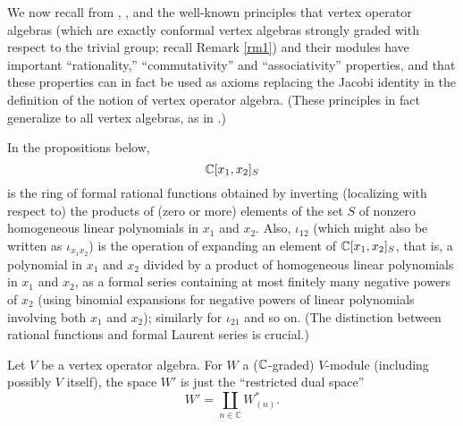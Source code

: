 \documentclass[12pt]{article}
\begin{document}
We now recall {}from \cite{FLM2}, \cite{FHL}, \cite{DL} and \cite{LL}
the well-known principles that vertex operator algebras (which are
exactly conformal vertex algebras strongly graded with respect to the
trivial group; recall Remark \ref{rm1}) and their modules have
important ``rationality,'' ``commutativity'' and ``associativity''
properties, and that these properties can in fact be used as axioms
replacing the Jacobi identity in the definition of the notion of
vertex operator algebra.  (These principles in fact generalize to all
vertex algebras, as in \cite{LL}.)

In the propositions below,
\[
{\mathbb{C}}[x_{1}, x_{2}]_{S}
\]
is the ring of formal rational functions obtained by inverting (localizing with
respect to) the products of (zero or more) elements of the set $S$ of
nonzero homogeneous linear polynomials in $x_{1}$ and $x_{2}$. Also,
$\iota_{12}$ (which might also be written as $\iota_{x_{1}x_{2}}$) is
the operation of expanding an element of ${\mathbb{C}}[x_{1}, x_{2}]_{S}$,
that is, a polynomial in $x_{1}$ and $x_{2}$ divided by a product of
homogeneous linear polynomials in $x_{1}$ and $x_{2}$, as a formal
series containing at most finitely many negative powers of $x_{2}$
(using binomial expansions for negative powers of linear polynomials
involving both $x_{1}$ and $x_{2}$); similarly for $\iota_{21}$ and so
on. (The distinction between rational functions and formal Laurent
series is crucial.)

Let $V$ be a vertex operator algebra.  For $W$ a ($\mathbb{C}$-graded)
$V$-module (including possibly $V$ itself), the space $W'$ is just the
``restricted dual space''
\begin{equation}
W'=\coprod_{n\in{\mathbb C}} W_{(n)}^{*}.
\end{equation}
\end{document}
